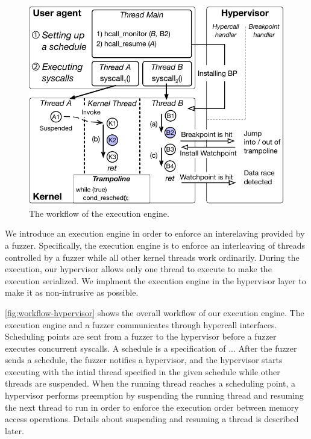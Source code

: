 \begin{figure}
  \includegraphics[width=0.9\linewidth]{fig/workflow-hypervisor.pdf}
  \caption{The workflow of the execution engine. }
  \label{fig:workflow-hypervisor}
\end{figure}

We introduce an execution engine in order to enforce an interelaving
provided by a fuzzer.
%
Specifically, the execution engine is to enforce an interleaving of
threads controlled by a fuzzer while all other kernel threads work
ordinarily.
%
During the execution, our hypervisor allows only one thread to execute
to make the execution serialized.
%
We implment the execution engine in the hypervisor layer to make it as
non-intrusive as possible.

%
\autoref{fig:workflow-hypervisor} shows the overall workflow of our
execution engine.
%
The execution engine and a fuzzer communicates through hypercall
interfaces.
%
Scheduling points are sent from a fuzzer to the hypervisor before a
fuzzer executes concurrent syscalls.
%
A schedule is a specification of ...
%
After the fuzzer sends a schedule, the fuzzer notifies a hypervisor,
and the hypervisor starts executing with the intial thread specified
in the given schedule while other threads are suspended.
%
When the running thread reaches a scheduling point, a hypervisor
performs preemption by suspending the running thread and resuming the
next thread to run in order to enforce the execution order between
memory access operations.
%
Details about suspending and resuming a thread is described later.
%


